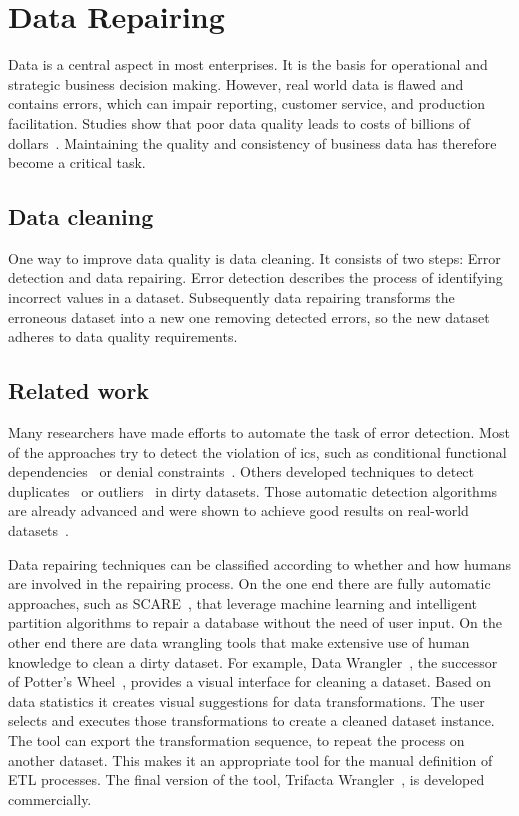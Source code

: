 
\section{Data Repairing}\label{sec:introduction}
  Data is a central aspect in most enterprises.
  It is the basis for operational and strategic business decision making.
  However, real world data is flawed and contains errors, which can impair reporting, customer service, and production facilitation.
  Studies show that poor data quality leads to costs of billions of dollars~\cite{Redman:quality_disaster, cost_of_low_qual}.
  Maintaining the quality and consistency of business data has therefore become a critical task.

  \subsection{Data cleaning}
  One way to improve data quality is data cleaning.
  It consists of two steps: Error detection and data repairing.
  Error detection describes the process of identifying incorrect values in a dataset.
  Subsequently data repairing transforms the erroneous dataset into a new one removing detected errors, so the new dataset adheres to data quality requirements.

  \subsection{Related work}
  Many researchers have made efforts to automate the task of error detection.
  Most of the approaches try to detect the violation of \glspl{ic}, such as conditional functional dependencies~\cite{bohannon2007conditional} or denial constraints~\cite{chu2013discoveringdc}.
  Others developed techniques to detect duplicates~\cite{koudas2006record,naumann2010introduction} or outliers~\cite{das2007detecting,hellerstein2008quantitative} in dirty datasets.
  Those automatic detection algorithms are already advanced and were shown to achieve good results on real-world datasets~\cite{abedjan2016detecting}.

  Data repairing techniques can be classified according to whether and how humans are involved in the repairing process.
  On the one end there are fully automatic approaches, such as SCARE~\cite{scare}, that leverage machine learning and intelligent partition algorithms to repair a database without the need of user input.
  On the other end there are data wrangling tools that make extensive use of human knowledge to clean a dirty dataset.
  For example, Data Wrangler~\cite{data_wrangler}, the successor of Potter's Wheel~\cite{potters_wheel}, provides a visual interface for cleaning a dataset.
  Based on data statistics it creates visual suggestions for data transformations.
  The user selects and executes those transformations to create a cleaned dataset instance.
  The tool can export the transformation sequence, to repeat the process on another dataset.
  This makes it an appropriate tool for the manual definition of ETL processes.
  The final version of the tool, Trifacta Wrangler~\cite{trifacta_wrangler}, is developed commercially.

